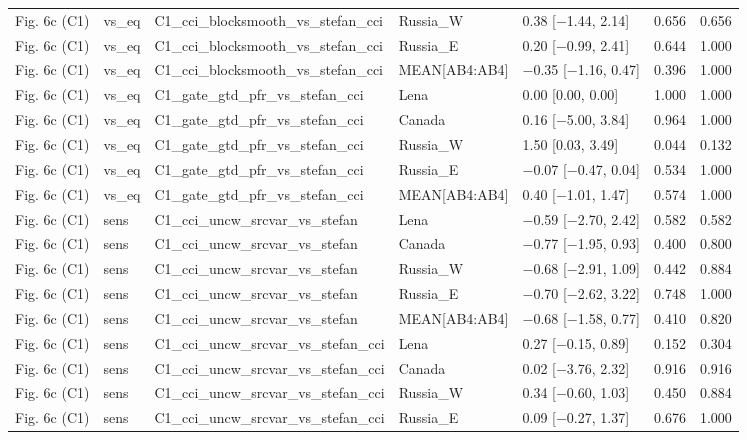 \begin{longtable}{lllllrr}
Fig. 6c (C1) & vs\_eq & C1\_cci\_blocksmooth\_vs\_stefan\_cci & Russia\_W & 0.38 [$-$1.44, 2.14] & 0.656 & 0.656 \\
Fig. 6c (C1) & vs\_eq & C1\_cci\_blocksmooth\_vs\_stefan\_cci & Russia\_E & 0.20 [$-$0.99, 2.41] & 0.644 & 1.000 \\
Fig. 6c (C1) & vs\_eq & C1\_cci\_blocksmooth\_vs\_stefan\_cci & MEAN[AB4:AB4] & $-$0.35 [$-$1.16, 0.47] & 0.396 & 1.000 \\
Fig. 6c (C1) & vs\_eq & C1\_gate\_gtd\_pfr\_vs\_stefan\_cci & Lena & 0.00 [0.00, 0.00] & 1.000 & 1.000 \\
Fig. 6c (C1) & vs\_eq & C1\_gate\_gtd\_pfr\_vs\_stefan\_cci & Canada & 0.16 [$-$5.00, 3.84] & 0.964 & 1.000 \\
Fig. 6c (C1) & vs\_eq & C1\_gate\_gtd\_pfr\_vs\_stefan\_cci & Russia\_W & 1.50 [0.03, 3.49] & 0.044 & 0.132 \\
Fig. 6c (C1) & vs\_eq & C1\_gate\_gtd\_pfr\_vs\_stefan\_cci & Russia\_E & $-$0.07 [$-$0.47, 0.04] & 0.534 & 1.000 \\
Fig. 6c (C1) & vs\_eq & C1\_gate\_gtd\_pfr\_vs\_stefan\_cci & MEAN[AB4:AB4] & 0.40 [$-$1.01, 1.47] & 0.574 & 1.000 \\
Fig. 6c (C1) & sens & C1\_cci\_uncw\_srcvar\_vs\_stefan & Lena & $-$0.59 [$-$2.70, 2.42] & 0.582 & 0.582 \\
Fig. 6c (C1) & sens & C1\_cci\_uncw\_srcvar\_vs\_stefan & Canada & $-$0.77 [$-$1.95, 0.93] & 0.400 & 0.800 \\
Fig. 6c (C1) & sens & C1\_cci\_uncw\_srcvar\_vs\_stefan & Russia\_W & $-$0.68 [$-$2.91, 1.09] & 0.442 & 0.884 \\
Fig. 6c (C1) & sens & C1\_cci\_uncw\_srcvar\_vs\_stefan & Russia\_E & $-$0.70 [$-$2.62, 3.22] & 0.748 & 1.000 \\
Fig. 6c (C1) & sens & C1\_cci\_uncw\_srcvar\_vs\_stefan & MEAN[AB4:AB4] & $-$0.68 [$-$1.58, 0.77] & 0.410 & 0.820 \\
Fig. 6c (C1) & sens & C1\_cci\_uncw\_srcvar\_vs\_stefan\_cci & Lena & 0.27 [$-$0.15, 0.89] & 0.152 & 0.304 \\
Fig. 6c (C1) & sens & C1\_cci\_uncw\_srcvar\_vs\_stefan\_cci & Canada & 0.02 [$-$3.76, 2.32] & 0.916 & 0.916 \\
Fig. 6c (C1) & sens & C1\_cci\_uncw\_srcvar\_vs\_stefan\_cci & Russia\_W & 0.34 [$-$0.60, 1.03] & 0.450 & 0.884 \\
Fig. 6c (C1) & sens & C1\_cci\_uncw\_srcvar\_vs\_stefan\_cci & Russia\_E & 0.09 [$-$0.27, 1.37] & 0.676 & 1.000 \\

\end{longtable}
